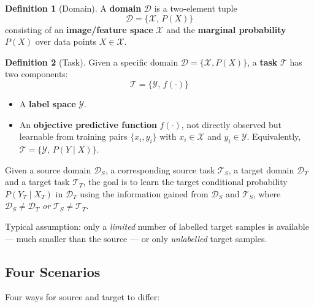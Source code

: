 \documentclass[11pt,a4paper]{article}
\theoremstyle{definition}
\newtheorem{definition}{Definition}[section]
\theoremstyle{plain}
\theoremstyle{remark}
\begin{document}
\begin{definition}[Domain]
A \textbf{domain} $\mathcal{D}$ is a two-element tuple
\begin{equation*}
    \mathcal{D} = \{\mathcal{X},\, P(X)\}
\end{equation*}
consisting of an \textbf{image/feature space} $\mathcal{X}$ and the \textbf{marginal probability} $P(X)$ over data points $X \in \mathcal{X}$.
\end{definition}

\begin{definition}[Task]
Given a specific domain $\mathcal{D} = \{\mathcal{X}, P(X)\}$, a \textbf{task} $\mathcal{T}$ has two components:
\begin{equation*}
    \mathcal{T} = \{\mathcal{Y},\, f(\cdot)\}
\end{equation*}
\begin{itemize}
    \item A \textbf{label space} $\mathcal{Y}$.
    \item An \textbf{objective predictive function} $f(\cdot)$, not directly observed but learnable from training pairs $\{x_i, y_i\}$ with $x_i \in \mathcal{X}$ and $y_i \in \mathcal{Y}$. Equivalently, $\mathcal{T} = \{\mathcal{Y},\, P(Y\mid X)\}$.
\end{itemize}
\end{definition}

\begin{tcolorbox}[colback=green!5!white,colframe=green!60!black,title=\textbf{Objective of Transfer Learning}]
Given a source domain $\mathcal{D}_S$, a corresponding source task $\mathcal{T}_S$, a target domain $\mathcal{D}_T$ and a target task $\mathcal{T}_T$, the goal is to learn the target conditional probability $P(Y_T\mid X_T)$ in $\mathcal{D}_T$ using the information gained from $\mathcal{D}_S$ and $\mathcal{T}_S$, where $\mathcal{D}_S \neq \mathcal{D}_T$ \emph{or} $\mathcal{T}_S \neq \mathcal{T}_T$.
\end{tcolorbox}

Typical assumption: only a \emph{limited} number of labelled target samples is available --- much smaller than the source --- or only \emph{unlabelled} target samples.

\subsection{Four Scenarios}

Four ways for source and target to differ:
\end{document}
